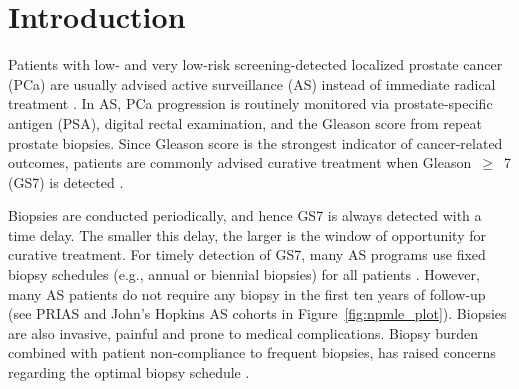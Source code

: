 \section{Introduction}
Patients with low- and very low-risk screening-detected localized prostate cancer (PCa) are usually advised active surveillance (AS) instead of immediate radical treatment \citep{briganti2018active}. In AS, PCa progression is routinely monitored via prostate-specific antigen (PSA), digital rectal examination, and the Gleason score from repeat prostate biopsies. Since Gleason score is the strongest indicator of cancer-related outcomes, patients are commonly advised curative treatment when Gleason~$\geq$~7 (GS7) is detected \citep{bul2013active}.

Biopsies are conducted periodically, and hence GS7 is always detected with a time delay. The smaller this delay, the larger is the window of opportunity for curative treatment. For timely detection of GS7, many AS programs use fixed biopsy schedules (e.g., annual or biennial biopsies) for all patients \citep{nieboer2018active,loeb2014heterogeneity}. However, many AS patients do not require any biopsy in the first ten years of follow-up (see PRIAS and John's Hopkins AS cohorts in Figure~\ref{fig:npmle_plot}). Biopsies are also invasive, painful and prone to medical complications. Biopsy burden combined with patient non-compliance \citep{bokhorst2015compliance} to frequent biopsies, has raised concerns regarding the optimal biopsy schedule \citep{inoue2018comparative, bratt2013study}.

